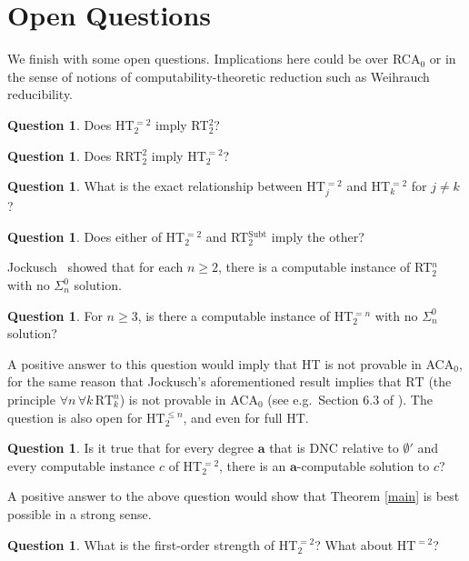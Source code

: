 \documentclass{amsart}
\theoremstyle{definition}
\newtheorem{q}[thm]{Question}
\renewcommand{\leq}{\leqslant}
\renewcommand{\geq}{\geqslant}
\DeclareMathOperator{\subt}{Subt}
\begin{document}
\section{Open Questions}

We finish with some open questions. Implications here could be over
RCA$_0$ or in the sense of notions of computability-theoretic
reduction such as Weihrauch reducibility.

\begin{q}
Does HT$^{=2}_2$ imply RT$^2_2$?
\end{q}

\begin{q}
Does RRT$^2_2$ imply HT$^{=2}_2$? 
\end{q}

\begin{q}
What is the exact relationship between HT$^{=2}_j$ and HT$^{=2}_k$ for
$j \neq k$?
\end{q}

\begin{q}
Does either of HT$^{=2}_2$ and RT$^{\subt}_2$ imply the other?
\end{q}

Jockusch~\cite{J} showed that for each $n \geq 2$, there is a
computable instance of RT$^n_2$ with no $\Sigma^0_n$ solution.

\begin{q}
For $n \geq 3$, is there a computable instance of HT$^{=n}_2$ with no
$\Sigma^0_n$ solution?
\end{q}

A positive answer to this question would imply that HT is not provable
in ACA$_0$, for the same reason that Jockusch's aforementioned result
implies that $\textrm{RT}$ (the principle $\forall n\, \forall k\,
\textrm{RT}^n_k$) is not provable in ACA$_0$ (see e.g.\ Section 6.3 of
\cite{Hbook}). The question is also open for HT$^{\leq n}_2$, and even
for full HT.

\begin{q}
Is it true that for every degree $\mathbf a$ that is DNC relative to
$\emptyset'$ and every computable instance $c$ of HT$^{=2}_2$, there
is an $\mathbf a$-computable solution to $c$?
\end{q}

A positive answer to the above question would show that Theorem
\ref{main} is best possible in a strong sense.

\begin{q}
What is the first-order strength of HT$^{=2}_2$? What about HT$^{=2}$?
\end{q}
\end{document}

